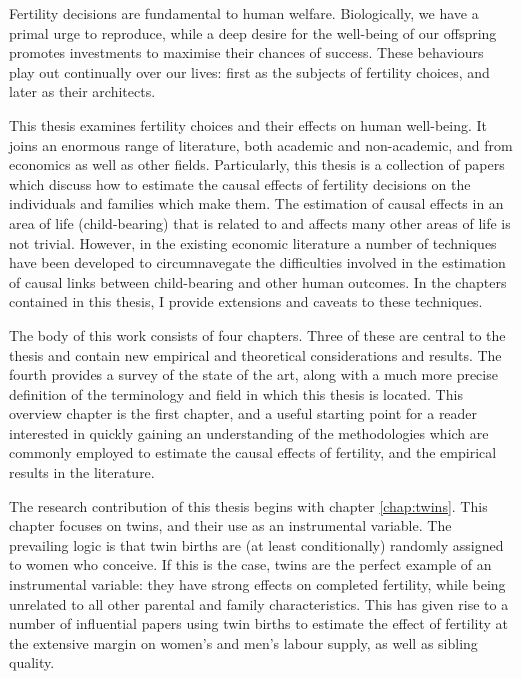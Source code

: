 Fertility decisions are fundamental to human welfare. Biologically, we have a 
primal urge %
to reproduce, while a deep desire for the well-being of our offspring promotes 
investments to maximise their chances of success.  These behaviours play out 
continually over our lives: first as the subjects of fertility choices, and 
later as their architects.

This thesis examines fertility choices and their effects on human well-being.
It joins an enormous range of literature, both academic and non-academic, and
from economics as well as other fields.  Particularly, this thesis is a 
collection of papers which discuss how to estimate the causal effects of
fertility decisions on the individuals and families which make them.  The 
estimation of causal effects in an area of life (child-bearing) that is related 
to and affects many other areas of life is not trivial.  However, in the 
existing economic literature a number of techniques have been developed to 
circumnavegate the difficulties involved in the estimation of causal links
between child-bearing and other human outcomes.  In the chapters contained in 
this thesis, I provide extensions and caveats to these techniques.

The body of this work consists of four chapters.  Three of these are central
to the thesis and contain new empirical and theoretical considerations and 
results.  The fourth provides a survey of the state of the art,
along with a much more precise definition of the terminology and field in
which this thesis is located.  This overview chapter is the first chapter,
and a useful starting point for a reader interested in quickly gaining an
understanding of the methodologies which are commonly employed to estimate the
causal effects of fertility, and the empirical results in the literature.

The research contribution of this thesis begins with chapter \ref{chap:twins}.
This chapter focuses on twins, and their use as an instrumental variable. The
prevailing logic is that twin births are (at least conditionally) randomly 
assigned to women who conceive.  If this is the case, twins are the perfect
example of an instrumental variable: they have strong effects on completed
fertility, while being unrelated to all other parental and family 
characteristics.  This has given rise to a number of influential papers using
twin births to estimate the effect of fertility at the extensive margin on
women's and men's labour supply, as well as sibling quality.

